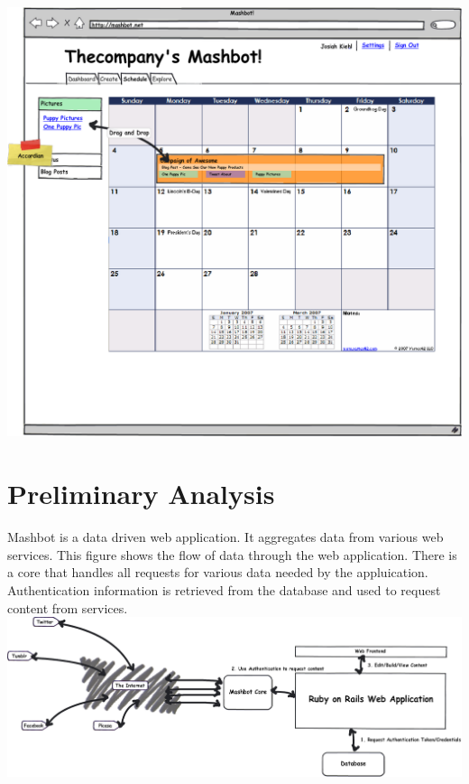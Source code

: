 \documentclass{report}
\begin{document}
        \clearpage
        \includegraphics[width=7.5in]{../mockups/schedule.png}
        \clearpage
\section{Preliminary Analysis} %
Mashbot is a data driven web application.  It aggregates data from various web services.  This figure shows the flow of data through the web application.
There is a core that handles all requests for various data needed by the appluication.  Authentication information is retrieved from the database and used to request content from services.
\includegraphics[width=7.5in]{../mockups/dataflow.png}
\end{document}
